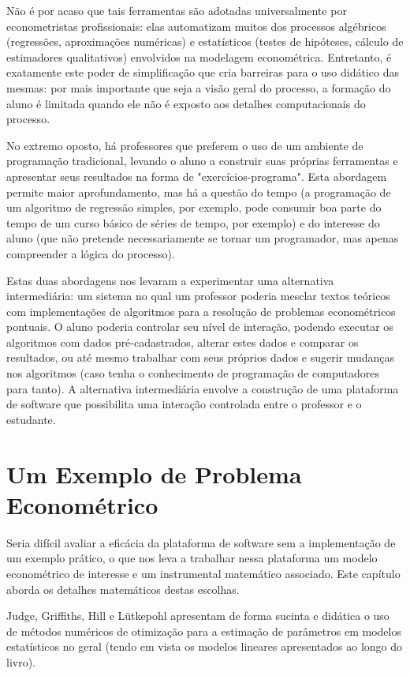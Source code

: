 \documentclass{abnt}
\begin{document}
	Não é por acaso que tais ferramentas são adotadas universalmente por econometristas profissionais: elas automatizam muitos dos processos algébricos (regressões, aproximações numéricas) e estatísticos (testes de hipóteses, cálculo de estimadores qualitativos) envolvidos na modelagem econométrica. Entretanto, é exatamente este poder de simplificação que cria barreiras para o uso didático das mesmas: por mais importante que seja a visão geral do processo, a formação do aluno é limitada quando ele não é exposto aos detalhes computacionais do processo.

No extremo oposto, há professores que preferem o uso de um ambiente de programação tradicional, levando o aluno a construir suas próprias ferramentas e apresentar seus resultados na forma de "exercícios-programa". Esta abordagem permite maior aprofundamento, mas há a questão do tempo (a programação de um algoritmo de regressão simples, por exemplo, pode consumir boa parte do tempo de um curso básico de séries de tempo, por exemplo) e do interesse do aluno (que não pretende necessariamente se tornar um programador, mas apenas compreender a lógica do processo).

	Estas duas abordagens nos levaram a experimentar uma alternativa intermediária: um sistema no qual um professor poderia mesclar textos teóricos com implementações de algoritmos para a resolução de problemas econométricos pontuais. O aluno poderia controlar seu nível de interação, podendo executar os algoritmos com dados pré-cadastrados, alterar estes dados e comparar os resultados, ou até mesmo trabalhar com seus próprios dados e sugerir mudanças nos algoritmos (caso tenha o conhecimento de programação de computadores para tanto). A alternativa intermediária envolve a construção de uma plataforma de software que possibilita uma interação controlada entre o professor e o estudante.

	\section {Um Exemplo de Problema Econométrico}

Seria difícil avaliar a eficácia da plataforma de software sem a implementação de um exemplo prático, o que nos leva a trabalhar nessa plataforma um modelo econométrico de interesse e um instrumental matemático associado. Este capítulo aborda os detalhes matemáticos destas escolhas.


	Judge, Griffiths, Hill e Lütkepohl\cite{judge} apresentam de forma sucinta e didática o uso de métodos numéricos de otimização para a estimação de parâmetros em modelos estatísticos no geral (tendo em vista os modelos lineares apresentados ao longo do livro).
\end{document}
